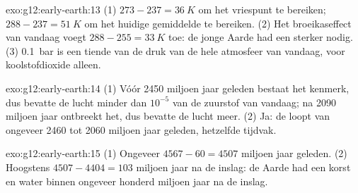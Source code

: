 \begin{solution}{exo:g12:early-earth:13}
(1) $273 - 237 = \qty{36}{K}$ om het vriespunt te bereiken; $288 - 237 = \qty{51}{K}$ om
het huidige gemiddelde te bereiken. (2) Het broeikaseffect van vandaag voegt $288 - 255 =
\qty{33}{K}$ toe: de jonge Aarde had een sterker nodig. (3) \qty{0.1}{bar} is een
tiende van de druk van de hele atmosfeer van vandaag, voor koolstofdioxide alleen.
\end{solution}

\begin{solution}{exo:g12:early-earth:14}
(1) Vóór 2450 miljoen jaar geleden bestaat het kenmerk, dus bevatte de lucht minder
dan $10^{-5}$ van de zuurstof van vandaag; na 2090 miljoen jaar ontbreekt het, dus
bevatte de lucht meer. (2) Ja: de  loopt van ongeveer 2460 tot
2060 miljoen jaar geleden, hetzelfde tijdvak.
\end{solution}

\begin{solution}{exo:g12:early-earth:15}
(1) Ongeveer $4567 - 60 = 4507$ miljoen jaar geleden. (2) Hoogstens $4507 - 4404 =
103$ miljoen jaar na de inslag: de Aarde had een korst en water binnen
ongeveer honderd miljoen jaar na de inslag.
\end{solution}


